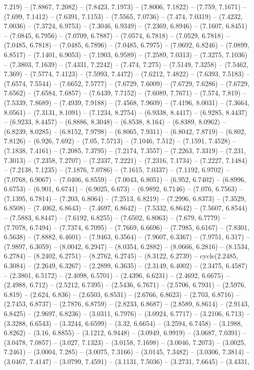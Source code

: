 7.219) -- (7.8867, 7.2082) -- (7.8423, 7.1973) -- (7.8006, 7.1822) -- (7.759, 7.1671) -- (7.699, 7.1412) -- (7.6391, 7.1153) -- (7.5565, 7.0736) -- (7.474, 7.0319) -- (7.4232, 7.0036) -- (7.3724, 6.9753) -- (7.3046, 6.9349) -- (7.2369, 6.8946) -- (7.1607, 6.8451) -- (7.0845, 6.7956) -- (7.0709, 6.7887) -- (7.0574, 6.7818) -- (7.0529, 6.7818) -- (7.0485, 6.7818) -- (7.0485, 6.7896) -- (7.0485, 6.7975) -- (7.0692, 6.8246) -- (7.0899, 6.8517) -- (7.1401, 6.9053) -- (7.1903, 6.9589) -- (7.2589, 7.0313) -- (7.3275, 7.1036) -- (7.3803, 7.1639) -- (7.4331, 7.2242) -- (7.474, 7.275) -- (7.5149, 7.3258) -- (7.5462, 7.369) -- (7.5774, 7.4123) -- (7.5993, 7.4472) -- (7.6212, 7.4822) -- (7.6393, 7.5183) -- (7.6574, 7.5544) -- (7.6652, 7.5777) -- (7.6729, 7.6009) -- (7.6729, 7.6286) -- (7.6729, 7.6562) -- (7.6584, 7.6857) -- (7.6439, 7.7152) -- (7.6089, 7.7671) -- (7.574, 7.819) -- (7.5339, 7.8689) -- (7.4939, 7.9188) -- (7.4568, 7.9609) -- (7.4196, 8.0031) -- (7.3664, 8.0561) -- (7.3131, 8.1091) -- (7.1234, 8.2754) -- (6.9338, 8.4417) -- (6.9285, 8.4437) -- (6.9233, 8.4457) -- (6.8886, 8.3048) -- (6.8538, 8.164) -- (6.8389, 8.0962) -- (6.8239, 8.0285) -- (6.8152, 7.9798) -- (6.8065, 7.9311) -- (6.8042, 7.8719) -- (6.802, 7.8126) -- (6.926, 7.692) -- (7.05, 7.5713) -- (7.1046, 7.512) -- (7.1591, 7.4528) -- (7.1838, 7.4161) -- (7.2085, 7.3795) -- (7.2174, 7.3557) -- (7.2263, 7.3319) -- (7.231, 7.3013) -- (7.2358, 7.2707) -- (7.2337, 7.2221) -- (7.2316, 7.1734) -- (7.2227, 7.1484) -- (7.2138, 7.1235) -- (7.1876, 7.0786) -- (7.1615, 7.0337) -- (7.1192, 6.9702) -- (7.0768, 6.9067) -- (7.0406, 6.8559) -- (7.0043, 6.8051) -- (6.952, 6.7402) -- (6.8996, 6.6753) -- (6.901, 6.6741) -- (6.9025, 6.673) -- (6.9892, 6.7146) -- (7.076, 6.7563) -- (7.1395, 6.7814) -- (7.203, 6.8064) -- (7.2513, 6.8219) -- (7.2996, 6.8373) -- (7.3529, 6.8508) -- (7.4062, 6.8643) -- (7.4697, 6.8642) -- (7.5332, 6.8642) -- (7.5607, 6.8544) -- (7.5883, 6.8447) -- (7.6192, 6.8255) -- (7.6502, 6.8063) -- (7.679, 6.7779) -- (7.7078, 6.7494) -- (7.7374, 6.7095) -- (7.7669, 6.6696) -- (7.7985, 6.6167) -- (7.8301, 6.5638) -- (7.8882, 6.4601) -- (7.9463, 6.3564) -- (7.9607, 6.3367) -- (7.9751, 6.317) -- (7.9897, 6.3059) -- (8.0042, 6.2947) -- (8.0354, 6.2882) -- (8.0666, 6.2816) -- (8.1534, 6.2784) -- (8.2402, 6.2751) -- (8.2762, 6.2745) -- (8.3122, 6.2739) -- cycle(2.2485, 6.3084) -- (2.2649, 6.3267) -- (2.2899, 6.3635) -- (2.3149, 6.4002) -- (2.3475, 6.4587) -- (2.3801, 6.5172) -- (2.4098, 6.5701) -- (2.4396, 6.6231) -- (2.4692, 6.6675) -- (2.4988, 6.712) -- (2.5212, 6.7395) -- (2.5436, 6.7671) -- (2.5706, 6.7931) -- (2.5976, 6.819) -- (2.624, 6.836) -- (2.6503, 6.8531) -- (2.6766, 6.8623) -- (2.703, 6.8716) -- (2.7453, 6.8737) -- (2.7876, 6.8759) -- (2.8233, 6.8687) -- (2.8589, 6.8614) -- (2.9143, 6.8425) -- (2.9697, 6.8236) -- (3.0311, 6.7976) -- (3.0924, 6.7717) -- (3.2106, 6.713) -- (3.3288, 6.6543) -- (3.3244, 6.6599) -- (3.32, 6.6654) -- (3.2594, 6.7458) -- (3.1988, 6.8262) -- (3.16, 6.8855) -- (3.1212, 6.9448) -- (3.0949, 6.9919) -- (3.0687, 7.0391) -- (3.0478, 7.0857) -- (3.027, 7.1323) -- (3.0158, 7.1698) -- (3.0046, 7.2073) -- (3.0025, 7.2461) -- (3.0004, 7.285) -- (3.0075, 7.3166) -- (3.0145, 7.3482) -- (3.0306, 7.3814) -- (3.0467, 7.4147) -- (3.0799, 7.4591) -- (3.1131, 7.5036) -- (3.2731, 7.6645) -- (3.4331, 
